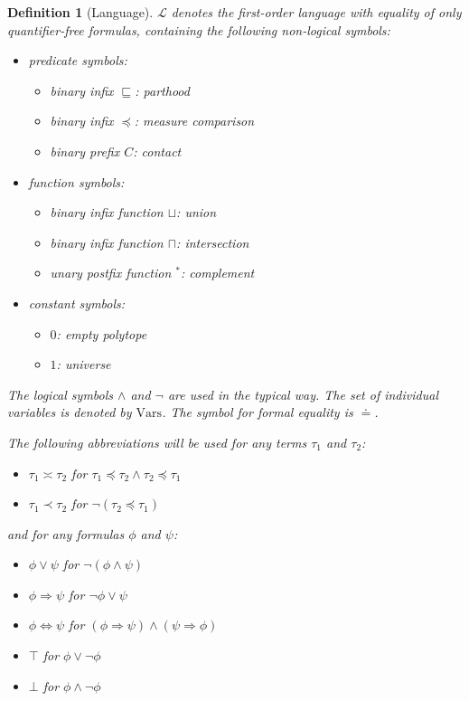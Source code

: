 \documentclass{article}
\newtheorem*{definition}{Definition}
\newcommand{\lang}{\mathcal{L}}
\newcommand{\Vars}{\text{Vars}}
\newcommand{\lcup}{\sqcup}
\newcommand{\lcap}{\sqcap}
\newcommand{\lstar}{^*}
\newcommand{\lpart}{\sqsubseteq}
\newcommand{\lparteq}{\doteq}
\newcommand{\lcont}{C}
\newcommand{\lmeasure}{\preceq}
\newcommand{\lmeasures}{\prec}
\newcommand{\lmeasureeq}{\asymp}
\begin{document}
\begin{definition}[Language]
  $\lang$ denotes the first-order language with equality of only quantifier-free formulas, containing the following non-logical symbols:
\begin{itemize}
  \item predicate symbols:
  \begin{itemize}
  \item binary infix $\lpart$: parthood
  \item binary infix $\lmeasure$: measure comparison
  \item binary prefix $\lcont$: contact
  \end{itemize}
  \item function symbols:
  \begin{itemize}
  \item binary infix function $\lcup$: union
  \item binary infix function $\lcap$: intersection
  \item unary postfix function $\lstar$: complement
  \end{itemize}
  \item constant symbols:
  \begin{itemize}
  \item $0$: empty polytope
  \item $1$: universe
  \end{itemize}
\end{itemize}

The logical symbols $\land$ and $\lnot$ are used in the typical way. The set of individual variables is denoted by $\Vars$. The symbol for formal equality is $\lparteq$.

The following abbreviations will be used for any terms $\tau_1$ and $\tau_2$:
\begin{itemize}
\item $\tau_1 \lmeasureeq \tau_2$ for $\tau_1 \lmeasure \tau_2 \land \tau_2 \lmeasure \tau_1$
\item $\tau_1 \lmeasures \tau_2$ for $\lnot (\tau_2 \lmeasure \tau_1)$
\end{itemize}
and for any formulas $\phi$ and $\psi$:
\begin{itemize}
\item $\phi \lor \psi$ for $\lnot(\phi \land \psi)$
\item $\phi \Rightarrow \psi$ for $\lnot\phi \lor \psi$
\item $\phi \Leftrightarrow \psi$ for $(\phi \Rightarrow \psi) \land (\psi \Rightarrow \phi)$
\item $\top$ for $\phi \lor \lnot \phi$
\item $\bot$ for $\phi \land \lnot \phi$
\end{itemize}
\end{definition}
\end{document}
